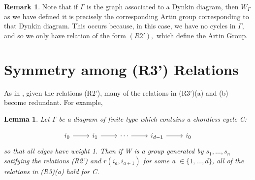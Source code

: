 \documentclass[11pt]{amsart}
\newtheorem{lem}[thm]{Lemma}
\theoremstyle{definition}
\newtheorem{rem}[thm]{Remark}
\begin{document}
\begin{rem}
Note that if $\Gamma$ is the graph associated to a Dynkin diagram, then $W_\Gamma$ as we have defined it is precisely the corresponding Artin group corresponding to that Dynkin diagram. This occurs because, in this case, we have no cycles in $\Gamma,$ and so we only have relation of the form $(R2'),$ which define the Artin Group.
\end{rem}

\section{Symmetry among (R3') Relations}
\label{sec:one_relation}

As in \cite{BM13}, given the relations (R2'), many of the relations in (R3')(a) and (b) become redundant. For example,

\begin{lem}
Let $\Gamma$ be a diagram of finite type which contains a chordless cycle C:

\begin{equation*}
\begin{tikzcd}
i_0 \arrow{r} & i_1 \arrow{r} & \cdots \arrow{r} & i_{d-1} \arrow{r} & i_0
\end{tikzcd}
\end{equation*}
so that all edges have weight 1. Then if W is a group generated by $s_{1}, \dots, s_{n}$ satifying the relations (R2') and $r(i_{a}, i_{a+1})$ for some a $\in \{1, \dots, d\}$, all of the relations in (R3)(a) hold for C.
\end{lem}
\end{document}
